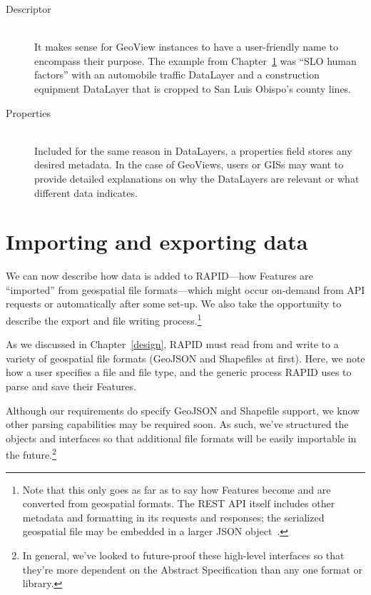 \begin{description}
\item[Descriptor] \hfill \\
It makes sense for GeoView instances to have a user-friendly name to encompass their purpose. The example from Chapter~\ref{} was ``SLO human factors'' with an automobile traffic DataLayer and a construction equipment DataLayer that is cropped to San Luis Obispo's county lines.

\item[Properties] \hfill \\
Included for the same reason in DataLayers, a properties field stores any desired metadata. In the case of GeoViews, users or GISs may want to provide detailed explanations on why the DataLayers are relevant or what different data indicates.

\end{description}


\section{Importing and exporting data}
We can now describe how data is added to RAPID---how Features are ``imported'' from geospatial file formats---which might occur on-demand from API requests or automatically after some set-up. We also take the opportunity to describe the export and file writing process.\footnote{Note that this only goes as far as to say how Features become and are converted from geospatial formats. The REST API itself includes other metadata and formatting in its requests and responses; the serialized geospatial file may be embedded in a larger JSON object~\cite{}.}

As we discussed in Chapter~\ref{design}, RAPID must read from and write to a variety of geospatial file formats (GeoJSON and Shapefiles at first). Here, we note how a user specifies a file and file type, and the generic process RAPID uses to parse and save their Features.

Although our requirements do specify GeoJSON and Shapefile support, we know other parsing capabilities may be required soon. As such, we've structured the objects and interfaces so that additional file formats will be easily importable in the future.\footnote{In general, we've looked to future-proof these high-level interfaces so that they're more dependent on the Abstract Specification than any one format or library.}

